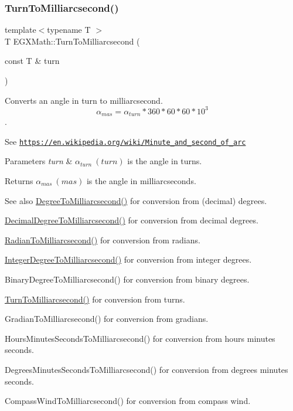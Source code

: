 \subsubsection{\texorpdfstring{Turn\+To\+Milliarcsecond()}{TurnToMilliarcsecond()}}
{\footnotesize\ttfamily template$<$typename T $>$ \\
T E\+G\+X\+Math\+::\+Turn\+To\+Milliarcsecond (\begin{DoxyParamCaption}\item[{const T \&}]{turn }\end{DoxyParamCaption})}



Converts an angle in turn to milliarcsecond. \[\alpha_{mas}=\alpha_{turn}* 360 * 60 * 60 * 10^3\]. 

See \href{https://en.wikipedia.org/wiki/Minute_and_second_of_arc}{\tt https\+://en.\+wikipedia.\+org/wiki/\+Minute\+\_\+and\+\_\+second\+\_\+of\+\_\+arc} 
\begin{DoxyParams}{Parameters}
{\em turn} & $\alpha_{turn}\ (turn)$ is the angle in turns. \\
\hline
\end{DoxyParams}
\begin{DoxyReturn}{Returns}
$\alpha_{mas}\ (mas)$ is the angle in milliarcseconds. 
\end{DoxyReturn}
\begin{DoxySeeAlso}{See also}
\mbox{\hyperlink{group___e_g_x_math-_angle_conversions-_degree_ga2c218e286b2ef72a00734dbc5a7f5ab6}{Degree\+To\+Milliarcsecond()}} for conversion from (decimal) degrees. 

\mbox{\hyperlink{group___e_g_x_math-_angle_conversions-_decimal_degree_gadb9ff3c92cf7484793f91e7de80c222e}{Decimal\+Degree\+To\+Milliarcsecond()}} for conversion from decimal degrees. 

\mbox{\hyperlink{group___e_g_x_math-_angle_conversions-_radian_ga84fbb494a455cfeb30be62776f96c9a9}{Radian\+To\+Milliarcsecond()}} for conversion from radians. 

\mbox{\hyperlink{group___e_g_x_math-_angle_conversions-_integer_degree_gadc43f22e832cd8fcf16b7bd2269ae348}{Integer\+Degree\+To\+Milliarcsecond()}} for conversion from integer degrees. 

Binary\+Degree\+To\+Milliarcsecond() for conversion from binary degrees. 

\mbox{\hyperlink{group___e_g_x_math-_angle_conversions-_turn_ga05d6fea8f8475831e93dd23f6196393f}{Turn\+To\+Milliarcsecond()}} for conversion from turns. 

Gradian\+To\+Milliarcsecond() for conversion from gradians. 

Hours\+Minutes\+Seconds\+To\+Milliarcsecond() for conversion from hours minutes seconds. 

Degrees\+Minutes\+Seconds\+To\+Milliarcsecond() for conversion from degrees minutes seconds. 

Compass\+Wind\+To\+Milliarcsecond() for conversion from compass wind. 
\end{DoxySeeAlso}
